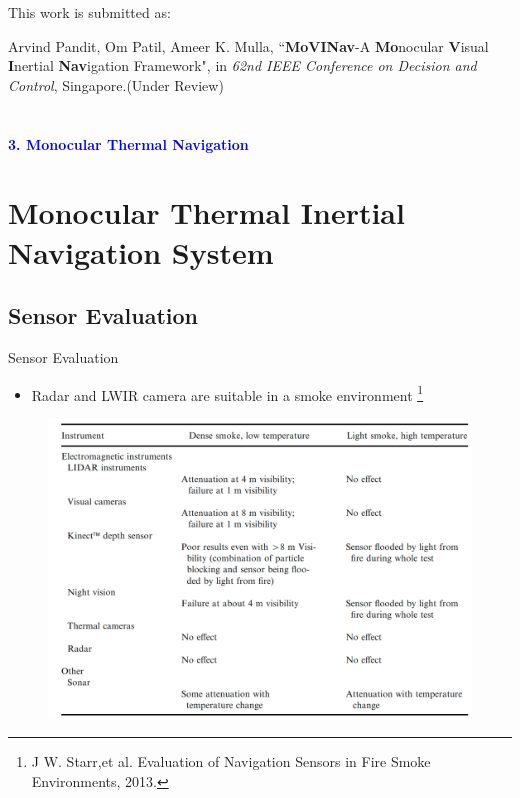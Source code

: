 \documentclass[10pt]{beamer}
\begin{document}
\begin{frame}{}
This work is submitted as:

\hspace{0.8cm}Arvind Pandit, Om Patil, Ameer K. Mulla, ``\textbf{MoVINav}-A \textbf{Mo}nocular \textbf{V}isual \textbf{I}nertial \textbf{Nav}igation Framework", in \textit{62nd IEEE Conference on Decision and Control}, Singapore.(Under Review)

\end{frame}
\section*{}
\begin{frame}{}
    \huge{\centerline{\textcolor{blue}{\textbf{3. Monocular Thermal Navigation }}}}
\end{frame}

\section{Monocular Thermal Inertial Navigation System}
\subsection*{Sensor Evaluation}
\begin{frame}{Sensor Evaluation}
    \begin{itemize}
        \item Radar and LWIR camera are suitable in a smoke environment \footnote{J W. Starr,et al. Evaluation of Navigation Sensors in Fire Smoke Environments, 2013.}
    \end{itemize}
    \begin{figure}[h!]
        \centering
        \includegraphics[scale=0.20]{Navigaion_sensor.png}
        \label{Fig:nav_eval}
    \end{figure}
\end{frame}
\end{document}

